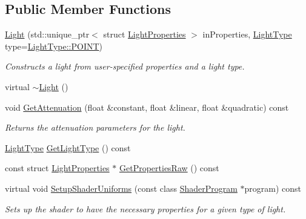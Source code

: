 \subsection*{Public Member Functions}
\begin{DoxyCompactItemize}
\item 
\hyperlink{class_light_adca12f0d5470bc3f2e6e77233ab3dcf1}{Light} (std\+::unique\+\_\+ptr$<$ struct \hyperlink{struct_light_properties}{Light\+Properties} $>$ in\+Properties, \hyperlink{class_light_a661d9480e01af8b1612860b9630ef5f8}{Light\+Type} type=\hyperlink{class_light_a661d9480e01af8b1612860b9630ef5f8aaebdbcb765394d25d6a604589a890f82}{Light\+Type\+::\+P\+O\+I\+N\+T})
\begin{DoxyCompactList}\small\item\em Constructs a light from user-\/specified properties and a light type. \end{DoxyCompactList}\item 
virtual \hyperlink{class_light_ad0e59fad13bb6cfadc25b2c477e9ddc7}{$\sim$\+Light} ()
\item 
void \hyperlink{class_light_a2d3f34b821c0cb0b5baa664ee91d309f}{Get\+Attenuation} (float \&constant, float \&linear, float \&quadratic) const 
\begin{DoxyCompactList}\small\item\em Returns the attenuation parameters for the light. \end{DoxyCompactList}\item 
\hyperlink{class_light_a661d9480e01af8b1612860b9630ef5f8}{Light\+Type} \hyperlink{class_light_a393ede80ccba5f4314135011a665afab}{Get\+Light\+Type} () const 
\item 
const struct \hyperlink{struct_light_properties}{Light\+Properties} $\ast$ \hyperlink{class_light_a074230bc62c5bf705bc39c1de64474c0}{Get\+Properties\+Raw} () const 
\item 
virtual void \hyperlink{class_light_a360ea479af434502737f6b5c0b0ff3d9}{Setup\+Shader\+Uniforms} (const class \hyperlink{class_shader_program}{Shader\+Program} $\ast$program) const 
\begin{DoxyCompactList}\small\item\em Sets up the shader to have the necessary properties for a given type of light. \end{DoxyCompactList}\end{DoxyCompactItemize}
